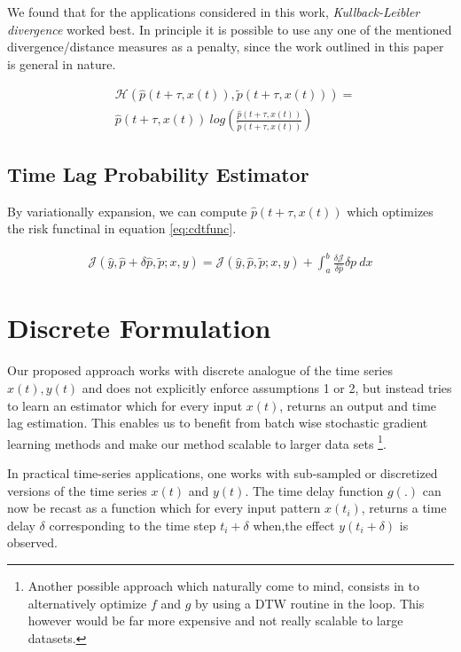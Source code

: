 \documentclass[envcountsect,runningheads]{llncs}
\theoremstyle{etoile}
\begin{document}
We found that for the applications considered in this work, \emph{Kullback-Leibler divergence} 
worked best. In principle it is possible to use any one of the mentioned 
divergence/distance measures as a penalty, since the work outlined in this 
paper is general in nature.

\begin{align}\label{eq:causaldiv}
&\mathcal{H}\left(\hat{p}(t + \tau, x(t)), \tilde{p}(t + \tau, x(t))\right) = \\
&\nonumber \hat{p}(t + \tau, x(t)) \ log \left( \frac{\hat{p}(t + \tau, x(t))}{\tilde{p}(t + \tau, x(t))}\right)
\end{align}

\subsection{Time Lag Probability Estimator}

By variationally expansion, we can compute $\hat{p}(t + \tau, x(t))$ which optimizes the risk functinal in 
equation \ref{eq:cdtfunc}.

\begin{align}
      \mathcal{J}(\hat{y}, \hat{p} + \delta \hat{p}, \tilde{p}; x, y) = 
      \mathcal{J}(\hat{y}, \hat{p}, \tilde{p}; x, y) + 
      \int_a^b \frac{\delta \mathcal{J}}{\delta \hat{p}} {\delta p} \ dx
\end{align}


\section{Discrete Formulation}

Our proposed approach works with discrete analogue of the time series $x(t), y(t)$ 
and does not explicitly enforce assumptions 1 or 2, but instead tries to learn an 
estimator which for every input $x(t)$, returns an output and time lag estimation. 
This enables us to benefit from batch wise stochastic gradient learning methods and 
make our method scalable to larger data sets \footnote{Another possible approach which 
naturally come to mind, consists in to alternatively optimize $f$ and $g$ by using a 
DTW routine in the loop. This however would be far more expensive and not 
really scalable to large datasets.}.

In practical time-series applications, one works with sub-sampled or discretized versions of the time 
series $x(t)$ and $y(t)$. The time delay function $g(.)$ can now be recast as a function which for 
every input pattern $x(t_i)$, returns a time delay $\delta$ corresponding to the time step 
$t_i + \delta$ when,the effect $y(t_i + \delta)$ is observed.
\end{document}
